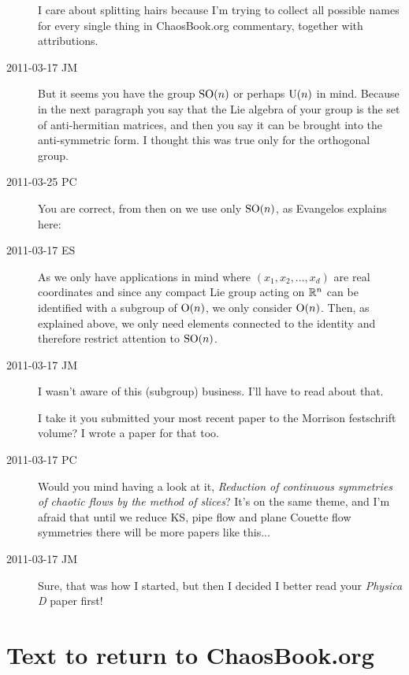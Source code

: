 \begin{description}
I care about splitting hairs because I'm trying to collect all possible
names for every single thing in ChaosBook.org commentary, together with
attributions.

\item[2011-03-17 JM]
But it seems you have the group $\textrm{SO}(n)$ or perhaps
$\textrm{U}(n)$ in mind. Because in the next paragraph
you say that the Lie algebra of your group is the set
of anti-hermitian matrices, and then you say it can be
brought into the anti-symmetric form. I thought this was
true only for the orthogonal group.

\item[2011-03-25 PC]
You are correct, from then on we use only  $\textrm{SO}(n)$, as Evangelos
explains here:

\item[2011-03-17 ES]
As we only have applications in mind where $(x_1,x_2,...,x_d)$ are real
coordinates and since any compact Lie group acting on $\mathbb{R}^n$ can be
identified with a subgroup of $\textrm{O}(n)$, we only consider $\textrm{O}(n)$. Then, as
explained above, we only need elements connected to the identity and
therefore restrict attention to $\textrm{SO}(n)$.

\item[2011-03-17 JM]
I wasn't aware of this (subgroup) business. I'll have to read about that.

I take it you submitted your most recent paper to the Morrison
festschrift volume? I wrote a paper for that too.

\item[2011-03-17 PC]
Would you mind having a look at it,
{\emph{Reduction of continuous symmetries}} \emph{of chaotic flows by the
method of slices}? It's on the same theme, and I'm afraid that until we
reduce KS, pipe flow and plane Couette flow symmetries there will be more
papers like this...

\item[2011-03-17 JM]
Sure, that was how I started, but then I decided I better read
your \emph{Physica D} paper first!

\end{description}


\section{Text to return to ChaosBook.org}
\label{sect:toCB}


